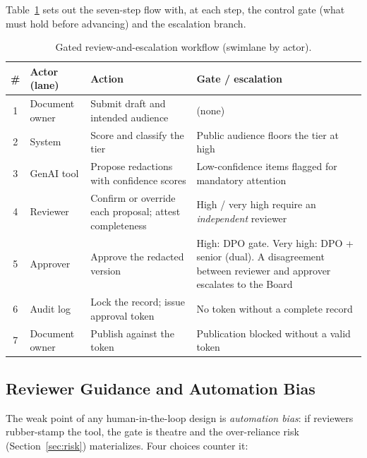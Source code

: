 \documentclass[12pt,a4paper]{article}
\begin{document}
Table~\ref{tab:workflow} sets out the seven-step flow with, at each step, the control gate (what must hold before advancing) and the escalation branch.

\begin{table}[H]
\centering
\small
{}
\begin{tabular}{@{} c p{2.9cm} p{4.1cm} p{4.9cm} @{}}
\toprule
\textbf{\color{accentdark}\#} & \textbf{\color{accentdark}Actor (lane)} & \textbf{\color{accentdark}Action} & \textbf{\color{accentdark}Gate / escalation} \\
\midrule
1 & Document owner & Submit draft and intended audience & (none) \\
2 & System & Score and classify the tier & Public audience floors the tier at high \\
3 & GenAI tool & Propose redactions with confidence scores & Low-confidence items flagged for mandatory attention \\
4 & Reviewer & Confirm or override each proposal; attest completeness & High / very high require an \emph{independent} reviewer \\
5 & Approver & Approve the redacted version & High: DPO gate. Very high: DPO + senior (dual). A disagreement between reviewer and approver escalates to the Board \\
6 & Audit log & Lock the record; issue approval token & No token without a complete record \\
7 & Document owner & Publish against the token & Publication blocked without a valid token \\
\bottomrule
\end{tabular}
\caption{Gated review-and-escalation workflow (swimlane by actor).}
\label{tab:workflow}
\end{table}

\subsection{Reviewer Guidance and Automation Bias}

The weak point of any human-in-the-loop design is \emph{automation bias}: if reviewers rubber-stamp the tool, the gate is theatre and the over-reliance risk (Section~\ref{sec:risk}) materializes. Four choices counter it:
\end{document}
